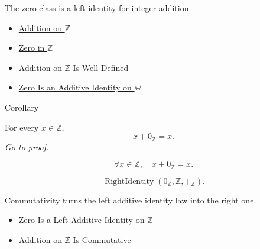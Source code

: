 \begin{remark*}[Interpretation]
The zero class is a left identity for integer addition.
\end{remark*}

\begin{dependencies}
\begin{itemize}
  \item \hyperref[def:addition-on-z-classes]{Addition on $\mathbb{Z}$}
  \item \hyperref[def:zero-in-z]{Zero in $\mathbb{Z}$}
  \item \hyperref[thm:addition-on-z-well-defined]{Addition on $\mathbb{Z}$ Is Well-Defined}
  \item \hyperref[thm:zero-additive-identity-on-w]{Zero Is an Additive Identity on $\mathbb{W}$}
\end{itemize}
\end{dependencies}

\begin{corollarybox}{Corollary}
\begin{corollary}
\label{cor:zero-right-additive-identity-on-z}
For every $x\in\mathbb{Z}$,
\[
x+0_{\mathbb{Z}}=x.
\]
\hyperref[prf:zero-right-additive-identity-on-z]{\textit{Go to proof.}}
\end{corollary}
\end{corollarybox}

\begin{remark*}
\[
\forall x\in\mathbb{Z},\quad x+0_{\mathbb{Z}}=x.
\]
\end{remark*}

\begin{remark*}
\[
\operatorname{RightIdentity}(0_{\mathbb{Z}},\mathbb{Z},+_{\mathbb{Z}}).
\]
\end{remark*}

\begin{remark*}[Interpretation]
Commutativity turns the left additive identity law into the right one.
\end{remark*}

\begin{dependencies}
\begin{itemize}
  \item \hyperref[thm:zero-left-additive-identity-on-z]{Zero Is a Left Additive Identity on $\mathbb{Z}$}
  \item \hyperref[thm:addition-on-z-commutative]{Addition on $\mathbb{
Z}$ Is Commutative}
\end{itemize}
\end{dependencies}

